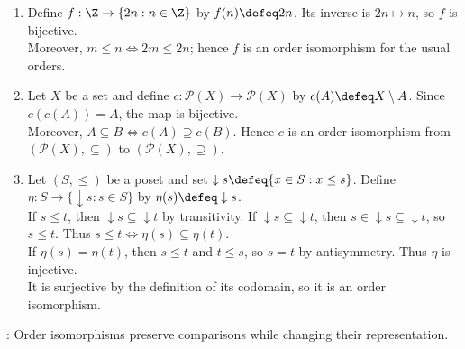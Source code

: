 \begin{example} \label{ex:basic-order-isomorphisms} 
\begin{enumerate}[label=(\roman*)]
\setlength{\itemsep}{0pt}
\item Define $f:\Z\to\{2n:n\in\Z\}$ by $f(n)\defeq2n$. Its inverse is $2n\mapsto n$, so $f$ is bijective.\\
Moreover, $m\leq n\Longleftrightarrow2m\leq2n$; hence $f$ is an order isomorphism for the usual orders.
\item Let $X$ be a set and define $c:\mathcal{P}(X)\to\mathcal{P}(X)$ by $c(A)\defeq X\setminus A$. Since $c(c(A))=A$, the map is bijective.\\
Moreover, $A\subseteq B\Longleftrightarrow c(A)\supseteq c(B)$. Hence $c$ is an order isomorphism from $(\mathcal{P}(X),\subseteq)$ to $(\mathcal{P}(X),\supseteq)$.
\item Let $(S,\leq)$ be a poset and set $\downarrow s\defeq\{x\in S:x\leq s\}$. Define $\eta:S\to\{\downarrow s:s\in S\}$ by $\eta(s)\defeq\downarrow s$.\\
If $s\leq t$, then $\downarrow s\subseteq\downarrow t$ by transitivity. If $\downarrow s\subseteq\downarrow t$, then $s\in\downarrow s\subseteq\downarrow t$, so $s\leq t$. Thus $s\leq t\Longleftrightarrow\eta(s)\subseteq\eta(t)$.\\
If $\eta(s)=\eta(t)$, then $s\leq t$ and $t\leq s$, so $s=t$ by antisymmetry. Thus $\eta$ is injective.\\
It is surjective by the definition of its codomain, so it is an order isomorphism.
\end{enumerate}
: Order isomorphisms preserve comparisons while changing their representation.
\end{example}
